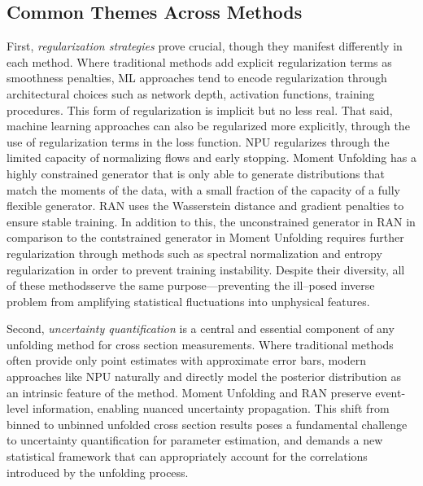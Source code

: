     \subsection{Common Themes Across Methods}
        First, \emph{regularization strategies} prove crucial, though they manifest differently in each method.
        Where traditional methods add explicit regularization terms as smoothness penalties, ML approaches tend to encode regularization through architectural choices such as network depth, activation functions, training procedures.
        This form of regularization is implicit but no less real.
        That said, machine learning approaches can also be regularized more explicitly, through the use of regularization terms in the loss function.
        NPU regularizes through the limited capacity of normalizing flows and early stopping.
        Moment Unfolding has a highly constrained generator that is only able to generate distributions that match the moments of the data, with a small fraction of the capacity of a fully flexible generator.
        RAN uses the Wasserstein distance and gradient penalties to ensure stable training.
        In addition to this, the unconstrained generator in RAN in comparison to the contstrained generator in Moment Unfolding requires further regularization through methods such as spectral normalization and entropy regularization in order to prevent training instability.
        Despite their diversity, all of these methodsserve the same purpose---preventing the ill--posed inverse problem from amplifying statistical fluctuations into unphysical features.

        Second, \emph{uncertainty quantification} is a central and essential component of any unfolding method for cross section measurements.
        Where traditional methods often provide only point estimates with approximate error bars, modern approaches like NPU naturally and directly model the posterior distribution as an intrinsic feature of the method.
        Moment Unfolding and RAN preserve event-level information, enabling nuanced uncertainty propagation.
        This shift from binned to unbinned unfolded cross section results poses a fundamental challenge to uncertainty quantification for parameter estimation, and demands a new statistical framework that can appropriately account for the correlations introduced by the unfolding process.

